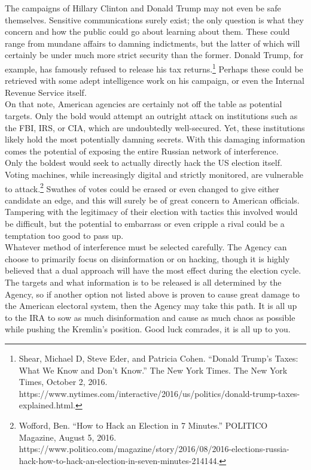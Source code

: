 \documentclass[10pt, letterpaper]{article}
\begin{document}
The campaigns of Hillary Clinton and Donald Trump may not even be safe
themselves. Sensitive communications surely exist; the only question is
what they concern and how the public could go about learning about them.
These could range from mundane affairs to damning indictments, but the
latter of which will certainly be under much more strict security than
the former. Donald Trump, for example, has famously refused to release
his tax returns.\footnote{Shear, Michael D, Steve Eder, and Patricia
  Cohen. ``Donald Trump's Taxes: What We Know and Don't Know.'' The New
  York Times. The New York Times, October 2, 2016.
  https://www.nytimes.com/interactive/2016/us/politics/donald-trump-taxes-explained.html.}
Perhaps these could be retrieved with some adept intelligence work on
his campaign, or even the Internal Revenue Service itself. \\

On that note, American agencies are certainly not off the table as
potential targets. Only the bold would attempt an outright attack on
institutions such as the FBI, IRS, or CIA, which are undoubtedly
well-secured. Yet, these institutions likely hold the most potentially
damning secrets. With this damaging information comes the potential of
exposing the entire Russian network of interference. \\

Only the boldest would seek to actually directly hack the US election
itself. Voting machines, while increasingly digital and strictly
monitored, are vulnerable to attack.\footnote{Wofford, Ben. ``How to
  Hack an Election in 7 Minutes.'' POLITICO Magazine, August 5, 2016.
  https://www.politico.com/magazine/story/2016/08/2016-elections-russia-hack-how-to-hack-an-election-in-seven-minutes-214144.}
Swathes of votes could be erased or even changed to give either
candidate an edge, and this will surely be of great concern to American
officials. Tampering with the legitimacy of their election with tactics
this involved would be difficult, but the potential to embarrass or even
cripple a rival could be a temptation too good to pass up. \\

Whatever method of interference must be selected carefully. The Agency
can choose to primarily focus on disinformation or on hacking, though it
is highly believed that a dual approach will have the most effect during
the election cycle. The targets and what information is to be released
is all determined by the Agency, so if another option not listed above
is proven to cause great damage to the American electoral system, then
the Agency may take this path. It is all up to the IRA to sow as much
disinformation and cause as much chaos as possible while pushing the
Kremlin's position. Good luck comrades, it is all up to you. \\
\end{document}
